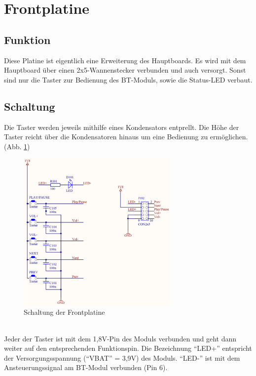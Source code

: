 \section{Frontplatine}
\subsection{Funktion}
Diese Platine ist eigentlich eine Erweiterung des Hauptboards. Es wird mit dem Hauptboard über einen 2x5-Wannenstecker verbunden und auch versorgt. Sonst sind nur die Taster zur Bedienung des BT-Moduls, sowie die Status-LED verbaut.

\subsection{Schaltung}
Die Taster werden jeweils mithilfe eines Kondensators entprellt. Die Höhe der Taster reicht über die Kondensatoren hinaus um eine Bedienung zu ermöglichen. (Abb. \ref{fig:abb3.7})
\begin{figure} [h]
	\centering
	\includegraphics[width=0.7\textwidth]{schaltungen/front_sch.png}
	\caption{Schaltung der Frontplatine}\label {fig:abb3.7}
\end{figure} \\
Jeder der Taster ist mit dem 1,8V-Pin des Moduls verbunden und geht dann weiter auf den entsprechenden Funktionspin. Die Bezeichnung \enquote{LED+} entspricht der Versorgungsspannung (\enquote{VBAT} = 3,9V) des Moduls. \enquote{LED-} ist mit dem Ansteuerungssignal am BT-Modul verbunden (Pin 6).

